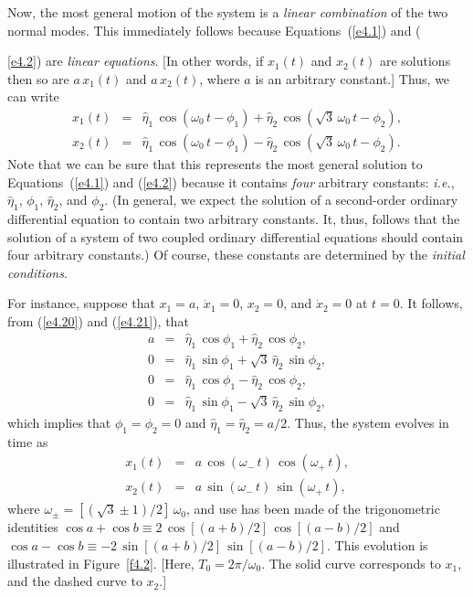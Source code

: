 Now, the most general motion of the system is a
{\em linear combination}\/ of the two normal modes. This immediately follows because 
Equations~(\ref{e4.1}) and ({\ref{e4.2}) are {\em linear equations}. [In other
words, if $x_1(t)$ and $x_2(t)$ are solutions then so are $a\,x_1(t)$ and $a\,x_2(t)$,
where $a$ is an arbitrary constant.] Thus, we can write
\begin{eqnarray}\label{e4.20}
x_1(t) &=& \hat{\eta}_1\,\cos(\omega_0\,t-\phi_1)+ \hat{\eta}_2\,\cos\left(\sqrt{3}\,\omega_0\,t-\phi_2\right),\\[0.5ex]
x_2(t) &=&  \hat{\eta}_1\,\cos(\omega_0\,t-\phi_1)-\hat{ \eta}_2\,\cos\left(\sqrt{3}\,\omega_0\,t-\phi_2\right).\label{e4.21}
\end{eqnarray}
Note that we can be sure that this represents the most general solution
to Equations~(\ref{e4.1}) and (\ref{e4.2}) because it contains {\em four}\/
arbitrary constants: {\em i.e.}, $\hat{\eta}_1$, $\phi_1$, $\hat{\eta}_2$, and $\phi_2$. (In general,
we expect the solution of a second-order ordinary differential equation to
contain two arbitrary constants. It, thus, follows that the solution of a system of two
coupled ordinary differential equations should contain four arbitrary constants.)
Of course, these constants are determined by the {\em initial conditions}. 

For instance, suppose that $x_1=a$, $\dot{x}_1=0$, $x_2=0$, and $\dot{x}_2=0$
at $t=0$. It follows, from (\ref{e4.20}) and (\ref{e4.21}), that
\begin{eqnarray}
a &=&\hat{\eta}_1\,\cos\phi_1 + \hat{\eta}_2\,\cos\phi_2,\\[0.5ex]
0&=&\hat{\eta}_1\,\sin\phi_1+\sqrt{3}\,\hat{\eta}_2\,\sin\phi_2,\\[0.5ex]
0&=&\hat{\eta}_1\,\cos\phi_1 -\hat{\eta}_2\,\cos\phi_2,\\[0.5ex]
0&=&\hat{\eta}_1\,\sin\phi_1-\sqrt{3}\,\hat{\eta}_2\,\sin\phi_2,
\end{eqnarray}
which implies that $\phi_1=\phi_2=0$ and $\hat{\eta}_1=\hat{\eta}_2=a/2$. Thus, the
system evolves in time as 
\begin{eqnarray}
x_1(t)&=& a\,\cos(\omega_-\,t)\,\cos(\omega_+\,t),\\[0.5ex]
x_2(t)&=&a\,\sin(\omega_-\,t)\,\sin(\omega_+\,t),
\end{eqnarray}
where $\omega_\pm = [(\sqrt{3}\pm 1)/2]\,\omega_0$, and
use has been made of the trigonometric identities $\cos a + \cos b\equiv 2\,\cos[(a+b)/2]\,\cos[(a-b)/2]$ and $\cos a - \cos b \equiv -2\,\sin[(a+b)/2]\,\sin[(a-b)/2]$. This evolution is
illustrated in Figure~\ref{f4.2}. [Here, $T_0=2\pi/\omega_0$. The solid curve
corresponds to $x_1$, and the dashed curve to $x_2$.]

}
